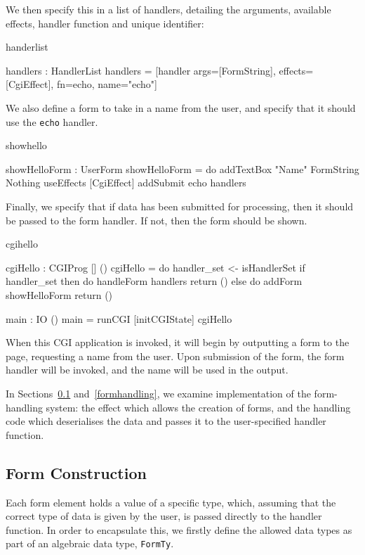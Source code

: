 \noindent
We then specify this in a list of handlers, detailing the arguments, available effects, handler function and unique identifier:

\begin{SaveVerbatim}{handerlist}

handlers : HandlerList
handlers = [handler args=[FormString], 
                    effects=[CgiEffect], 
                    fn=echo, 
                    name="echo"]

\end{SaveVerbatim}

\noindent
We also define a form to take in a name from the user, and specify that it
should use the \texttt{echo} handler.

\begin{SaveVerbatim}{showhello}

showHelloForm : UserForm
showHelloForm = do
  addTextBox "Name" FormString Nothing
  useEffects [CgiEffect]
  addSubmit echo handlers

\end{SaveVerbatim}

\noindent
Finally, we specify that if data has been submitted for processing, then it
should be passed to the form handler. If not, then the form should be shown.

\begin{SaveVerbatim}{cgihello}

cgiHello : CGIProg [] ()
cgiHello = do
  handler_set <- isHandlerSet
  if handler_set then do
    handleForm handlers
    return ()
  else do
    addForm showHelloForm
    return ()

main : IO ()
main = runCGI [initCGIState] cgiHello

\end{SaveVerbatim}

\noindent
When this CGI application is invoked, it will begin by outputting a form to the
page, requesting a name from the user. Upon submission of the form, the form
handler will be invoked, and the name will be used in the output.

In Sections~\ref{formcons} and~\ref{formhandling}, we examine implementation
of the form-handling system: the effect which allows the creation of
forms, and the handling code which deserialises the data and passes it to the
user-specified handler function.  

\subsection{Form Construction}
\label{formcons}
Each form element holds a value of a specific type, which, assuming that the
correct type of data is given by the user, is passed directly to the
handler function. In order to encapsulate this, we firstly define the allowed
data types as part of an algebraic data type, \texttt{FormTy}.

